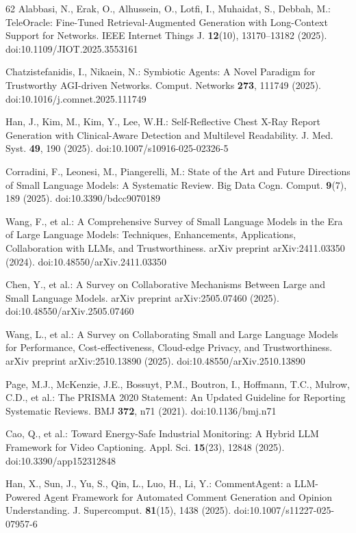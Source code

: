 \begin{thebibliography}{62}
Alabbasi, N., Erak, O., Alhussein, O., Lotfi, I., Muhaidat, S., Debbah, M.: TeleOracle: Fine-Tuned Retrieval-Augmented Generation with Long-Context Support for Networks. IEEE Internet Things J. \textbf{12}(10), 13170--13182 (2025). doi:10.1109/JIOT.2025.3553161

Chatzistefanidis, I., Nikaein, N.: Symbiotic Agents: A Novel Paradigm for Trustworthy AGI-driven Networks. Comput. Networks \textbf{273}, 111749 (2025). doi:10.1016/j.comnet.2025.111749

Han, J., Kim, M., Kim, Y., Lee, W.H.: Self-Reflective Chest X-Ray Report Generation with Clinical-Aware Detection and Multilevel Readability. J. Med. Syst. \textbf{49}, 190 (2025). doi:10.1007/s10916-025-02326-5

Corradini, F., Leonesi, M., Piangerelli, M.: State of the Art and Future Directions of Small Language Models: A Systematic Review. Big Data Cogn. Comput. \textbf{9}(7), 189 (2025). doi:10.3390/bdcc9070189

Wang, F., et al.: A Comprehensive Survey of Small Language Models in the Era of Large Language Models: Techniques, Enhancements, Applications, Collaboration with LLMs, and Trustworthiness. arXiv preprint arXiv:2411.03350 (2024). doi:10.48550/arXiv.2411.03350

Chen, Y., et al.: A Survey on Collaborative Mechanisms Between Large and Small Language Models. arXiv preprint arXiv:2505.07460 (2025). doi:10.48550/arXiv.2505.07460

Wang, L., et al.: A Survey on Collaborating Small and Large Language Models for Performance, Cost-effectiveness, Cloud-edge Privacy, and Trustworthiness. arXiv preprint arXiv:2510.13890 (2025). doi:10.48550/arXiv.2510.13890

Page, M.J., McKenzie, J.E., Bossuyt, P.M., Boutron, I., Hoffmann, T.C., Mulrow, C.D., et al.: The PRISMA 2020 Statement: An Updated Guideline for Reporting Systematic Reviews. BMJ \textbf{372}, n71 (2021). doi:10.1136/bmj.n71

Cao, Q., et al.: Toward Energy-Safe Industrial Monitoring: A Hybrid LLM Framework for Video Captioning. Appl. Sci. \textbf{15}(23), 12848 (2025). doi:10.3390/app152312848

Han, X., Sun, J., Yu, S., Qin, L., Luo, H., Li, Y.: CommentAgent: a LLM-Powered Agent Framework for Automated Comment Generation and Opinion Understanding. J. Supercomput. \textbf{81}(15), 1438 (2025). doi:10.1007/s11227-025-07957-6


\end{thebibliography}
